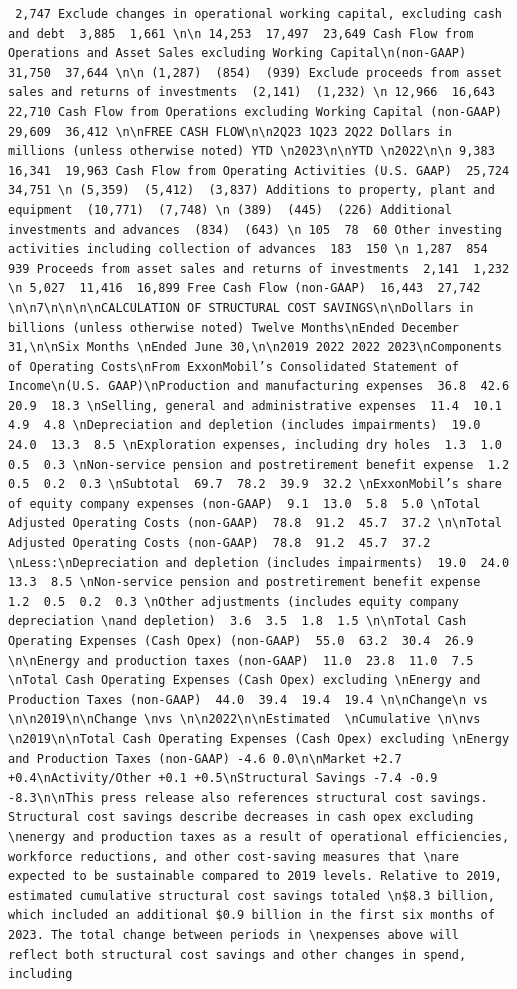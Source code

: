 \documentclass[
  letterpaper,
  DIV=11,
  numbers=noendperiod]{scrreprt}
\begin{document}
\begin{verbatim}
 2,747 Exclude changes in operational working capital, excluding cash and debt  3,885  1,661 \n\n 14,253  17,497  23,649 Cash Flow from Operations and Asset Sales excluding Working Capital\n(non-GAAP)  31,750  37,644 \n\n (1,287)  (854)  (939) Exclude proceeds from asset sales and returns of investments  (2,141)  (1,232) \n 12,966  16,643  22,710 Cash Flow from Operations excluding Working Capital (non-GAAP)  29,609  36,412 \n\nFREE CASH FLOW\n\n2Q23 1Q23 2Q22 Dollars in millions (unless otherwise noted) YTD \n2023\n\nYTD \n2022\n\n 9,383  16,341  19,963 Cash Flow from Operating Activities (U.S. GAAP)  25,724  34,751 \n (5,359)  (5,412)  (3,837) Additions to property, plant and equipment  (10,771)  (7,748) \n (389)  (445)  (226) Additional investments and advances  (834)  (643) \n 105  78  60 Other investing activities including collection of advances  183  150 \n 1,287  854  939 Proceeds from asset sales and returns of investments  2,141  1,232 \n 5,027  11,416  16,899 Free Cash Flow (non-GAAP)  16,443  27,742 \n\n7\n\n\n\nCALCULATION OF STRUCTURAL COST SAVINGS\n\nDollars in billions (unless otherwise noted) Twelve Months\nEnded December 31,\n\nSix Months \nEnded June 30,\n\n2019 2022 2022 2023\nComponents of Operating Costs\nFrom ExxonMobil’s Consolidated Statement of Income\n(U.S. GAAP)\nProduction and manufacturing expenses  36.8  42.6  20.9  18.3 \nSelling, general and administrative expenses  11.4  10.1  4.9  4.8 \nDepreciation and depletion (includes impairments)  19.0  24.0  13.3  8.5 \nExploration expenses, including dry holes  1.3  1.0  0.5  0.3 \nNon-service pension and postretirement benefit expense  1.2  0.5  0.2  0.3 \nSubtotal  69.7  78.2  39.9  32.2 \nExxonMobil’s share of equity company expenses (non-GAAP)  9.1  13.0  5.8  5.0 \nTotal Adjusted Operating Costs (non-GAAP)  78.8  91.2  45.7  37.2 \n\nTotal Adjusted Operating Costs (non-GAAP)  78.8  91.2  45.7  37.2 \nLess:\nDepreciation and depletion (includes impairments)  19.0  24.0  13.3  8.5 \nNon-service pension and postretirement benefit expense  1.2  0.5  0.2  0.3 \nOther adjustments (includes equity company depreciation \nand depletion)  3.6  3.5  1.8  1.5 \n\nTotal Cash Operating Expenses (Cash Opex) (non-GAAP)  55.0  63.2  30.4  26.9 \n\nEnergy and production taxes (non-GAAP)  11.0  23.8  11.0  7.5 \nTotal Cash Operating Expenses (Cash Opex) excluding \nEnergy and Production Taxes (non-GAAP)  44.0  39.4  19.4  19.4 \n\nChange\n vs \n\n2019\n\nChange \nvs \n\n2022\n\nEstimated  \nCumulative \n\nvs \n2019\n\nTotal Cash Operating Expenses (Cash Opex) excluding \nEnergy and Production Taxes (non-GAAP) -4.6 0.0\n\nMarket +2.7 +0.4\nActivity/Other +0.1 +0.5\nStructural Savings -7.4 -0.9 -8.3\n\nThis press release also references structural cost savings. Structural cost savings describe decreases in cash opex excluding \nenergy and production taxes as a result of operational efficiencies, workforce reductions, and other cost-saving measures that \nare expected to be sustainable compared to 2019 levels. Relative to 2019, estimated cumulative structural cost savings totaled \n$8.3 billion, which included an additional $0.9 billion in the first six months of 2023. The total change between periods in \nexpenses above will reflect both structural cost savings and other changes in spend, including 
\end{verbatim}
\end{document}
